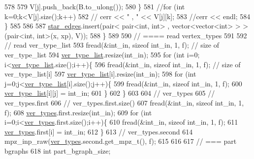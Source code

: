 \begin{DoxyCode}
578 
579         V[j].push\_back(B.to\_ulong());
580       \}
581       \textcolor{comment}{//for (int k=0;k<V[j].size();k++)}
582       \textcolor{comment}{//  cerr << " , " << V[j][k];}
583       \textcolor{comment}{//cerr << endl;}
584     \}
585 
586 
587     \hyperlink{classmarked__graph__compressed_a7df5779d313486644132bd816937f532}{star\_edges}.insert(pair< pair<int, int> , vector<vector<int> > > (pair<int, int>(x, xp), V));
588   \}
589 
590   \textcolor{comment}{// ==== read vertex\_types}
591 
592   \textcolor{comment}{// read ver\_type\_list}
593   fread(&int\_in, \textcolor{keyword}{sizeof} int\_in, 1, f); \textcolor{comment}{// size of ver\_type\_list}
594   \hyperlink{classmarked__graph__compressed_af2e3e55223d436628a02758dfae88493}{ver\_type\_list}.resize(int\_in);
595   \textcolor{keywordflow}{for} (\textcolor{keywordtype}{int} i=0; i<\hyperlink{classmarked__graph__compressed_af2e3e55223d436628a02758dfae88493}{ver\_type\_list}.size();i++)\{
596     fread(&int\_in, \textcolor{keyword}{sizeof} int\_in, 1, f); \textcolor{comment}{// size of ver\_type\_list[i]}
597     \hyperlink{classmarked__graph__compressed_af2e3e55223d436628a02758dfae88493}{ver\_type\_list}[i].resize(int\_in);
598     \textcolor{keywordflow}{for} (\textcolor{keywordtype}{int} j=0;j<\hyperlink{classmarked__graph__compressed_af2e3e55223d436628a02758dfae88493}{ver\_type\_list}[i].size();j++)\{
599       fread(&int\_in, \textcolor{keyword}{sizeof} int\_in, 1, f);
600       \hyperlink{classmarked__graph__compressed_af2e3e55223d436628a02758dfae88493}{ver\_type\_list}[i][j] = int\_in;
601     \}
602   \}
603 
604   \textcolor{comment}{// ver\_types}
605   \textcolor{comment}{// ver\_types.first}
606   \textcolor{comment}{// ver\_types.first.size()}
607   fread(&int\_in, \textcolor{keyword}{sizeof} int\_in, 1, f);
608   \hyperlink{classmarked__graph__compressed_af446cc5e23c241a92b76642fd5ebc403}{ver\_types}.first.resize(int\_in);
609   \textcolor{keywordflow}{for} (\textcolor{keywordtype}{int} i=0;i<\hyperlink{classmarked__graph__compressed_af446cc5e23c241a92b76642fd5ebc403}{ver\_types}.first.size();i++)\{
610     fread(&int\_in, \textcolor{keyword}{sizeof} int\_in, 1, f);
611     \hyperlink{classmarked__graph__compressed_af446cc5e23c241a92b76642fd5ebc403}{ver\_types}.first[i] = int\_in;
612   \}
613   \textcolor{comment}{// ver\_types.second}
614   mpz\_inp\_raw(\hyperlink{classmarked__graph__compressed_af446cc5e23c241a92b76642fd5ebc403}{ver\_types}.second.get\_mpz\_t(), f);
615 
616 
617   \textcolor{comment}{// === part bgraphs}
618   \textcolor{keywordtype}{int} part\_bgraph\_size;

\end{DoxyCode}
